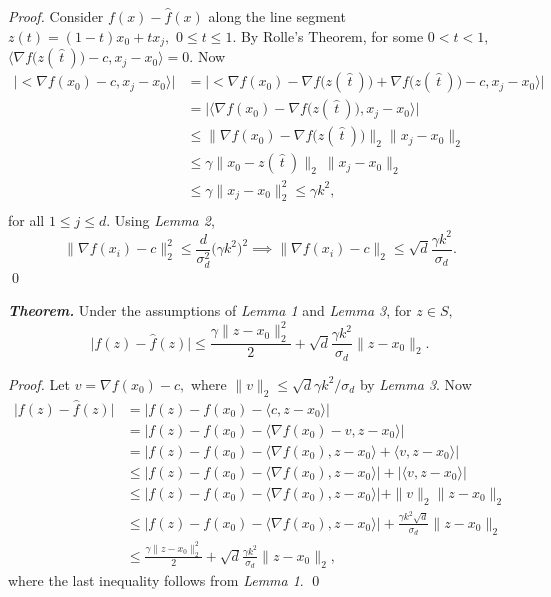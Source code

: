 \documentclass[smallextended]{svjour3}       %
\begin{document}
\noindent \textit{Proof.} Consider $f(x) - \hat f(x)$ along the line segment $z(t) = (1-t)x_0 + t x_j,$ $0 \leq t \leq 1.$ By Rolle's Theorem, for some $0 < \hat t < 1,$ $\big\langle \nabla f\big(z(\ \hat t\ )\big) - c, x_j - x_0 \big\rangle = 0.$ Now
%
\begin{align*}
  \big| \big< \nabla f(x_0) - c, x_j - x_0 \big \rangle \big|
        &= \big| \big< \nabla f(x_0) - \nabla f\big(z(\ \hat t\ )\big) + \nabla f\big(z(\ \hat t\ )\big) - c, x_j - x_0 \big \rangle \big| \\
	&= \big| \big\langle \nabla f(x_0) - \nabla f \big(z(\ \hat t\ )\big), x_j - x_0 \big \rangle \big| \\
	&\leq \big \| \nabla f(x_0) - \nabla f\big(z(\ \hat t\ )\big) \big \|_2 \|x_j - x_0\|_2 \\
	&\leq \gamma \|x_0 - z(\ \hat t\ )\|_2\ \|x_j - x_0\|_2 \\
	&\leq \gamma \|x_j - x_0\|_2^2 \leq \gamma k^2, \\
\end{align*}
%
for all $1 \leq j \leq d.$ Using {\it Lemma 2},
%
$$\big \| \nabla f(x_i) - c \big \|_2^2 \leq \frac{d}{\sigma_d^2} \big( \gamma k^2\big)^2 \implies \big \| \nabla f(x_i) - c \big \|_2 \leq \sqrt{d} \frac{\gamma k^2}{\sigma_d}.$$
%
\qed

\noindent \textbf{\textit{Theorem.}} Under the assumptions of {\it Lemma 1} and {\it Lemma 3}, for $z \in S,$
%
$$ \big|f(z) - \hat f(z)\big| \leq \frac{\gamma \|z - x_0\|_2^2}{2} + \sqrt{d} \frac{\gamma k^2}{\sigma_d} \|z - x_0\|_2.$$

\noindent \textit{Proof.} Let $v = \nabla f(x_0) - c,$ where $\|v\|_2 \leq \sqrt{d} \gamma k^2 / \sigma_d$ by {\it Lemma 3}. Now
%
\begin{align*}
  \big|f(z) - \hat f(z)\big|
       &= \big|f(z) - f(x_0) - \langle c, z - x_0 \rangle \big| \\ 
       &= \big|f(z) - f(x_0) - \langle \nabla f(x_0) - v, z - x_0 \rangle \big| \\
       &= \big|f(z) - f(x_0) - \langle \nabla f(x_0) , z - x_0 \rangle + \langle v , z - x_0 \rangle \big| \\
       &\leq \big|f(z) - f(x_0) - \langle \nabla f(x_0) , z - x_0 \rangle \big| + \big| \langle v , z - x_0 \rangle \big| \\
       &\leq \big|f(z) - f(x_0) - \langle \nabla f(x_0) , z - x_0 \rangle \big| + \|v\|_2 \|z - x_0\|_2 \\
       &\leq \big|f(z) - f(x_0) - \langle \nabla f(x_0), z - x_0 \rangle \big| + \textstyle{\frac{\gamma k^2 \sqrt{d}}{\sigma_d}} \|z - x_0\|_2 \\
       &\leq \frac{\gamma \|z - x_0\|_2^2}{2} + \sqrt{d}\frac{\gamma k^2}{\sigma_d} \|z - x_0\|_2,
\end{align*}
%
where the last inequality follows from {\it Lemma 1}.
%
\qed
\end{document}
